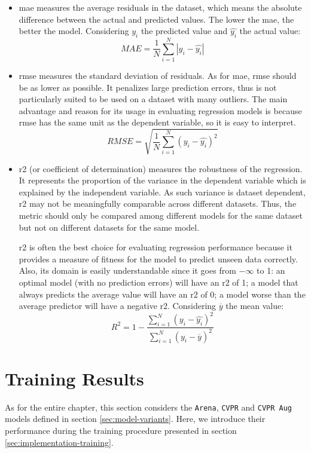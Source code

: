 \begin{itemize}
    \item \gls{mae} measures the average residuals in the dataset, which means the absolute difference between the actual and predicted values. The lower the \gls{mae}, the better the model. Considering $y_i$ the predicted value and $\hat{y_i}$ the actual value:
    $$ MAE = \frac{1}{N} \sum_{i=1}^N |y_i - \hat{y_i}| $$
    
    \item \gls{rmse} measures the standard deviation of residuals. As for \gls{mae}, \gls{rmse} should be as lower as possible. It penalizes large prediction errors, thus is not particularly suited to be used on a dataset with many outliers. The main advantage and reason for its usage in evaluating regression models is because \gls{rmse} has the same unit as the dependent variable, so it is easy to interpret.
    $$ RMSE = \sqrt{\frac{1}{N} \sum_{i=1}^N (y_i - \hat{y_i})^2} $$
    
    \item \gls{r2} (or coefficient of determination) measures the robustness of the regression. It represents the proportion of the variance in the dependent variable which is explained by the independent variable. As such variance is dataset dependent, \gls{r2} may not be meaningfully comparable across different datasets. Thus, the metric should only be compared among different models for the same dataset but not on different datasets for the same model.
    
    \gls{r2} is often the best choice for evaluating regression performance because it provides a measure of fitness for the model to predict unseen data correctly. Also, its domain is easily understandable since it goes from $-\infty$ to 1: an optimal model (with no prediction errors) will have an \gls{r2} of 1; a model that always predicts the average value will have an \gls{r2} of 0; a model worse than the average predictor will have a negative \gls{r2}. Considering $\overline{y}$ the mean value:
    $$ R^2 = 1 - \frac{\sum_{i=1}^N (y_i - \hat{y_i})^2}{\sum_{i=1}^N (y_i - \overline{y})^2} $$
\end{itemize}




\section{Training Results}
\label{sec:evaluation-training}

As for the entire chapter, this section considers the \texttt{Arena}, \texttt{CVPR} and \texttt{CVPR Aug} models defined in section \ref{sec:model-variants}. Here, we introduce their performance during the training procedure presented in section \ref{sec:implementation-training}.

